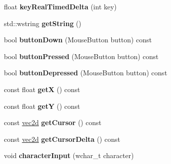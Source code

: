 \begin{DoxyCompactItemize}
\item 
\hypertarget{class_c_input_mgr_a0217e8c13e340a04cf90c8fafd8520de}{
float {\bfseries keyRealTimedDelta} (int key)}
\label{class_c_input_mgr_a0217e8c13e340a04cf90c8fafd8520de}

\item 
\hypertarget{class_c_input_mgr_a5f84e28a5365f736dcc0416b7b941f60}{
std::wstring {\bfseries getString} ()}
\label{class_c_input_mgr_a5f84e28a5365f736dcc0416b7b941f60}

\item 
\hypertarget{class_c_input_mgr_aa5ff24d2dcf27b1f11ee49637cf18a74}{
bool {\bfseries buttonDown} (MouseButton button) const }
\label{class_c_input_mgr_aa5ff24d2dcf27b1f11ee49637cf18a74}

\item 
\hypertarget{class_c_input_mgr_a7deb596c0ce6e4938e16b5544ede30bc}{
bool {\bfseries buttonPressed} (MouseButton button) const }
\label{class_c_input_mgr_a7deb596c0ce6e4938e16b5544ede30bc}

\item 
\hypertarget{class_c_input_mgr_a2c900fe5e03087823ead6ef77188e190}{
bool {\bfseries buttonDepressed} (MouseButton button) const }
\label{class_c_input_mgr_a2c900fe5e03087823ead6ef77188e190}

\item 
\hypertarget{class_c_input_mgr_a6fe7938a4f12f3343d595186f5fe0595}{
const float {\bfseries getX} () const }
\label{class_c_input_mgr_a6fe7938a4f12f3343d595186f5fe0595}

\item 
\hypertarget{class_c_input_mgr_a2079ed3d472c9ace3a51ec62daa5dad5}{
const float {\bfseries getY} () const }
\label{class_c_input_mgr_a2079ed3d472c9ace3a51ec62daa5dad5}

\item 
\hypertarget{class_c_input_mgr_a995c1931e1ad09401bcbef5e5cd48c2d}{
const \hyperlink{classvec2d}{vec2d} {\bfseries getCursor} () const }
\label{class_c_input_mgr_a995c1931e1ad09401bcbef5e5cd48c2d}

\item 
\hypertarget{class_c_input_mgr_a09031ea172829421bf10e3e127ab86be}{
const \hyperlink{classvec2d}{vec2d} {\bfseries getCursorDelta} () const }
\label{class_c_input_mgr_a09031ea172829421bf10e3e127ab86be}

\item 
\hypertarget{class_c_input_mgr_a0b224e0d1d4f470340e67725680049c1}{
void {\bfseries characterInput} (wchar\_\-t character)}
\label{class_c_input_mgr_a0b224e0d1d4f470340e67725680049c1}

\end{DoxyCompactItemize}
